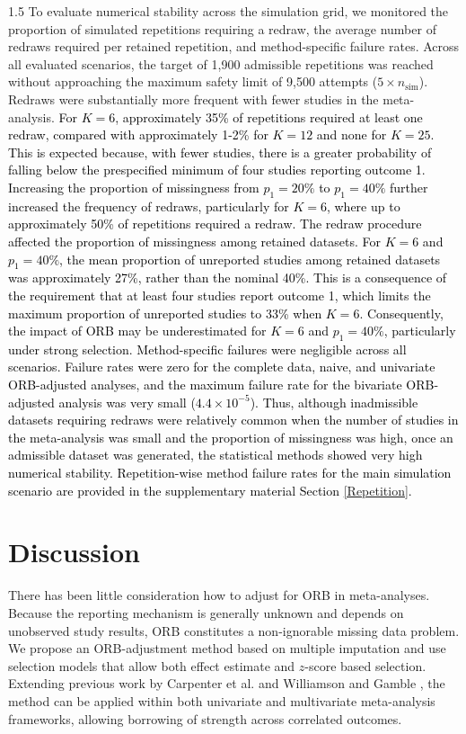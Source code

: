 \documentclass{article}
\newcommand{\mycolor}[1]{\textcolor{black}{#1}}
\begin{document}
\begin{spacing}{1.5}
To evaluate numerical stability across the simulation grid, we monitored the proportion of simulated repetitions requiring a redraw, the average number of redraws required per retained repetition, and method-specific failure rates. Across all evaluated scenarios, the target of 1,900 admissible repetitions was reached without approaching the maximum safety limit of 9,500 attempts ($5 \times n_{\text{sim}}$). Redraws were substantially more frequent with fewer studies in the meta-analysis. \mycolor{For $K=6$, approximately 35\% of repetitions required at least one redraw, compared with approximately 1-2\% for $K=12$ and none for $K=25$. This is expected because, with fewer studies, there is a greater probability of falling below the prespecified minimum of four studies reporting outcome 1. Increasing the proportion of missingness from $p_1=20\%$ to $p_1=40\%$ further increased the frequency of redraws, particularly for $K=6$, where up to approximately 50\% of repetitions required a redraw. The redraw procedure affected the proportion of missingness among retained datasets. For $K=6$ and $p_1=40\%$, the mean proportion of unreported studies among retained datasets was approximately 27\%, rather than the nominal 40\%. This is a consequence of the requirement that at least four studies report outcome 1, which limits the maximum proportion of unreported studies to 33\% when $K=6$. Consequently, the impact of ORB may be underestimated for $K=6$ and $p_1=40\%$, particularly under strong selection.}
\mycolor{Method-specific failures were negligible across all scenarios. Failure rates were zero for the complete data, naive, and univariate ORB-adjusted analyses, and the maximum failure rate for the bivariate ORB-adjusted analysis was very small ($4.4\times10^{-5}$). Thus, although inadmissible datasets requiring redraws were relatively common when the number of studies in the meta-analysis was small and the proportion of missingness was high, once an admissible dataset was generated, the statistical methods showed very high numerical stability. Repetition-wise method failure rates for the main simulation scenario are provided in the supplementary material Section \ref{Repetition}.}

\section{Discussion}
\label{discussion}

There has been little consideration how to adjust for ORB in meta-analyses. Because the reporting mechanism is generally unknown and depends on unobserved study results, ORB constitutes a non-ignorable missing data problem. We propose an ORB-adjustment method based on multiple imputation and use selection models that allow both effect estimate and $z$-score based selection. Extending previous work by Carpenter et al. \cite{carpenter2011assessing} and Williamson and Gamble \cite{williamson2005identification}, the method can be applied within both univariate and multivariate meta-analysis frameworks, allowing borrowing of strength across correlated outcomes.


\end{spacing}
\end{document}
